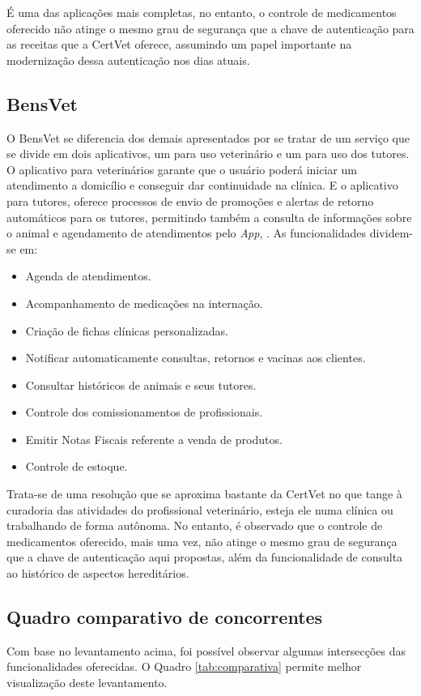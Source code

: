 \documentclass[
    12pt,               %
    openright,          %
    oneside,
    a4paper,            %
    BIBLATEX,           %
    TODO,               %
    english,            %
    brazil              %
    ]{ifsp-spo-inf-ctds}
\begin{document}
    É uma das aplicações mais completas, no entanto, o controle de medicamentos oferecido não atinge o mesmo grau de segurança que a chave de autenticação para as receitas que a CertVet oferece, assumindo um papel importante na modernização dessa autenticação nos dias atuais.

        \subsection{BensVet}
        O BensVet se diferencia dos demais apresentados por se tratar de um serviço que se divide em dois aplicativos, um para uso veterinário e um para uso dos tutores. O aplicativo para veterinários garante que o usuário poderá iniciar um atendimento a domicílio e conseguir  dar continuidade na clínica. E o aplicativo para tutores, oferece processos de envio  de promoções e alertas de retorno automáticos para os tutores, permitindo também a consulta de  informações sobre o animal e agendamento de atendimentos pelo \emph{App},  . As funcionalidades dividem-se em:

\begin{itemize}
    \item Agenda de atendimentos.
    \item Acompanhamento de medicações na internação.
    \item Criação de fichas clínicas personalizadas.
    \item Notificar automaticamente consultas, retornos e vacinas aos clientes.
    \item Consultar históricos de animais e seus tutores.
    \item Controle dos comissionamentos de profissionais.
    \item Emitir Notas Fiscais referente a venda de produtos.
    \item Controle de estoque.
\end{itemize}

    Trata-se de uma resolução que se aproxima bastante da CertVet no que tange à curadoria das atividades do profissional veterinário, esteja ele numa clínica ou trabalhando de forma autônoma. No entanto, é observado que o controle de medicamentos oferecido, mais uma vez, não atinge o mesmo grau de segurança que a chave de autenticação aqui propostas, além da funcionalidade de consulta ao histórico de aspectos hereditários.

    \subsection{Quadro comparativo de concorrentes}
    Com base no levantamento acima, foi possível observar algumas intersecções das funcionalidades oferecidas. O Quadro \ref{tab:comparativa} permite melhor visualização deste levantamento.
\end{document}
